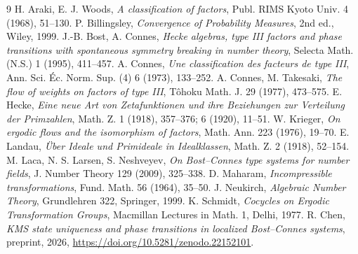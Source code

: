 \documentclass[11pt]{amsart}
\numberwithin{equation}{section}
\theoremstyle{definition}
\theoremstyle{remark}
\begin{document}
\begin{thebibliography}{9}
 H. Araki, E. J. Woods, \emph{A classification of factors}, Publ. RIMS Kyoto Univ. 4 (1968), 51--130.
 P. Billingsley, \emph{Convergence of Probability Measures}, 2nd ed., Wiley, 1999.
 J.-B. Bost, A. Connes, \emph{Hecke algebras, type III factors and phase transitions with spontaneous symmetry breaking in number theory}, Selecta Math. (N.S.) 1 (1995), 411--457.
 A. Connes, \emph{Une classification des facteurs de type III}, Ann. Sci. \'Ec. Norm. Sup. (4) 6 (1973), 133--252.
 A. Connes, M. Takesaki, \emph{The flow of weights on factors of type III}, T\^ohoku Math. J. 29 (1977), 473--575.
 E. Hecke, \emph{Eine neue Art von Zetafunktionen und ihre Beziehungen zur Verteilung der Primzahlen}, Math. Z. 1 (1918), 357--376; 6 (1920), 11--51.
 W. Krieger, \emph{On ergodic flows and the isomorphism of factors}, Math. Ann. 223 (1976), 19--70.
 E. Landau, \emph{\"Uber Ideale und Primideale in Idealklassen}, Math. Z. 2 (1918), 52--154.
 M. Laca, N. S. Larsen, S. Neshveyev, \emph{On Bost--Connes type systems for number fields}, J. Number Theory 129 (2009), 325--338.
 D. Maharam, \emph{Incompressible transformations}, Fund. Math. 56 (1964), 35--50.
 J. Neukirch, \emph{Algebraic Number Theory}, Grundlehren 322, Springer, 1999.
 K. Schmidt, \emph{Cocycles on Ergodic Transformation Groups}, Macmillan Lectures in Math. 1, Delhi, 1977.
 R. Chen, \emph{KMS state uniqueness and phase transitions in localized Bost--Connes systems}, preprint, 2026, \newline\url{https://doi.org/10.5281/zenodo.22152101}.
\end{thebibliography}
\end{document}
